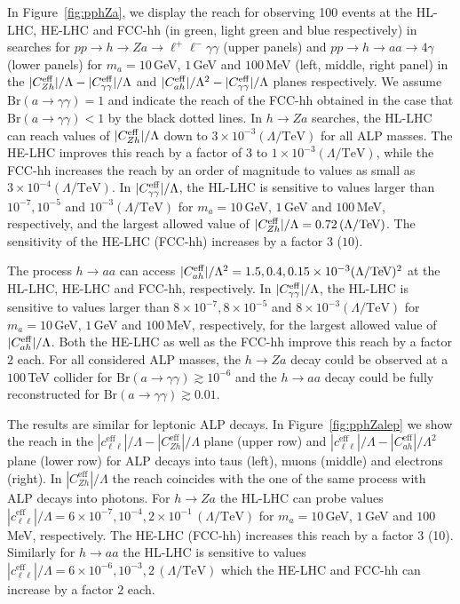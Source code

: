 In Figure~\ref{fig:pphZa}, we display the reach for observing 100 events at the HL-LHC, HE-LHC and FCC-hh (in green, light green and blue respectively) in searches for $pp\to h \to Za\to \ell^+\ell^-\gamma\gamma$ (upper panels) and  $pp\to h \to aa\to 4 \gamma$ (lower panels) for $m_a= 10\,$GeV, $1\,$GeV and $100\,$MeV (left, middle, right panel) in the $|C_{Zh}^{\rm eff}|/\Lambda - |C_{\gamma\gamma}^{\rm eff}|/\Lambda$ and $|C_{ah}^{\rm eff}|/\Lambda^2 - |C_{\gamma\gamma}^{\rm eff}|/\Lambda$ planes respectively. We assume $\text{Br}(a\to \gamma\gamma)=1$ and indicate the reach of the FCC-hh obtained in the case that $\text{Br}(a\to \gamma\gamma)<1$ by the black dotted lines. 
In $h \to Za$ searches, the HL-LHC can reach values of $|C_{Zh}^{\rm eff}|/\Lambda$ down to $3 \times 10^{-3} (\Lambda/\textrm{TeV})$ for all ALP masses. The HE-LHC improves this reach by a factor of $3$ to $1 \times 10^{-3} (\Lambda/\textrm{TeV})$, while the FCC-hh increases the reach by an order of magnitude to values as small as $3 \times 10^{-4} (\Lambda/\textrm{TeV})$. In $|C_{\gamma\gamma}^{\rm eff}|/\Lambda$, the HL-LHC is sensitive to values larger than $10^{-7}, 10^{-5}$ and $10^{-3} (\Lambda/\textrm{TeV})$ for $m_a = 10\,$GeV, $1\,$GeV and $100\,$MeV, respectively, and the largest allowed value of $|C_{Zh}^{\rm eff}|/\Lambda = 0.72\,(\Lambda/\textrm{TeV})$. The sensitivity of the HE-LHC (FCC-hh) increases by a factor $3$ ($10$). 

The process $h \to aa$ can access $|C_{ah}^{\rm eff}|/\Lambda^2 = 1.5, 0.4, 0.15 \times 10^{-3} (\Lambda/\textrm{TeV})^2$ at the HL-LHC, HE-LHC and FCC-hh, respectively. In $|C_{\gamma\gamma}^{\rm eff}|/\Lambda$, the HL-LHC is sensitive to values larger than $8 \times 10^{-7}, 8 \times 10^{-5}$ and $8 \times 10^{-3} (\Lambda/\textrm{TeV})$ for $m_a = 10\,$GeV, $1\,$GeV and $100\,$MeV, respectively, for the largest allowed value of $|C_{ah}^{\rm eff}|/\Lambda$. Both the HE-LHC as well as the FCC-hh improve this reach by a factor $2$ each. For all considered ALP masses, the $h\to Z a$ decay could be observed at a $100\,$TeV collider for $\text{Br}(a\to \gamma\gamma)\gtrsim 10^{-6}$ and the $h\to a a$ decay could be fully reconstructed for $\text{Br}(a\to \gamma\gamma)\gtrsim 0.01$.

The results are similar for leptonic ALP decays. In Figure~\ref{fig:pphZalep} we show the reach in the $|c_{\ell\ell}^\text{eff}|/\Lambda - |C_{Zh}^\text{eff}|/\Lambda$ plane (upper row) and  $|c_{\ell\ell}^\text{eff}|/\Lambda - |C_{ah}^\text{eff}|/\Lambda^2$ plane (lower row) for ALP decays into taus (left), muons (middle) and electrons (right). In $|C_{Zh}^\text{eff}|/\Lambda$ the reach coincides with the one of the same process with ALP decays into photons. For $h \to Za$ the HL-LHC can probe values $|c_{\ell\ell}^\text{eff}|/\Lambda = 6 \times 10^{-7}, 10^{-4}, 2 \times 10^{-1}\,(\Lambda/\textrm{TeV})$ for $m_a = 10\,$GeV, $1\,$GeV and $100\,$MeV, respectively. The HE-LHC (FCC-hh) increases this reach by a factor 3 (10). Similarly for $h \to aa$ the HL-LHC is sensitive to values $|c_{\ell\ell}^\text{eff}|/\Lambda = 6 \times 10^{-6}, 10^{-3}, 2 \,(\Lambda/\textrm{TeV})$ which the HE-LHC and FCC-hh can increase by a factor $2$ each.
